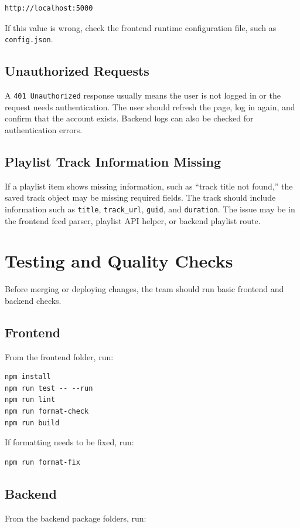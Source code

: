 \documentclass{article}
\begin{document}
\begin{verbatim}
http://localhost:5000
\end{verbatim}

If this value is wrong, check the frontend runtime configuration file, such as \texttt{config.json}.

\subsection{Unauthorized Requests}
A \texttt{401 Unauthorized} response usually means the user is not logged in or the request needs authentication. The user should refresh the page, log in again, and confirm that the account exists. Backend logs can also be checked for authentication errors.

\subsection{Playlist Track Information Missing}
If a playlist item shows missing information, such as ``track title not found,'' the saved track object may be missing required fields. The track should include information such as \texttt{title}, \texttt{track\_url}, \texttt{guid}, and \texttt{duration}. The issue may be in the frontend feed parser, playlist API helper, or backend playlist route.

\section{Testing and Quality Checks}
Before merging or deploying changes, the team should run basic frontend and backend checks.

\subsection{Frontend}
From the frontend folder, run:

\begin{verbatim}
npm install
npm run test -- --run
npm run lint
npm run format-check
npm run build
\end{verbatim}

If formatting needs to be fixed, run:

\begin{verbatim}
npm run format-fix
\end{verbatim}

\subsection{Backend}
From the backend package folders, run:
\end{document}
